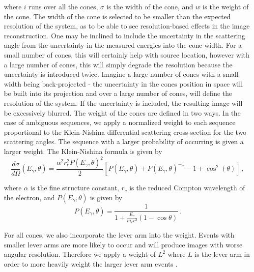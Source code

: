 \documentclass[10pt]{article}
\begin{document}
\noindent where $i$ runs over all the cones, $\sigma$ is the width of the cone, and $w$ is the weight of the cone. The width of the cone is selected to be smaller than the expected resolution of the system, as to be able to see resolution-based effects in the image reconstruction. One may be inclined to include the uncertainty in the scattering angle from the uncertainty in the measured energies into the cone width. For a small number of cones, this will certainly help with source location, however with a large number of cones, this will simply degrade the resolution because the uncertainty is introduced twice. Imagine a large number of cones with a small width being back-projected - the uncertainty in the cones position in space will be built into its projection and over a large number of cones, will define the resolution of the system. If the uncertainty is included, the resulting image will be excessively blurred. The weight of the cones are defined in two ways. In the case of ambiguous sequences, we apply a normalized weight to each sequence proportional to the Klein-Nishina differential scattering cross-section for the two scattering angles. The sequence with a larger probability of occurring is given a larger weight. The Klein-Nishina formula is given by 
%
\begin{equation}
\frac{d\sigma}{d\Omega}(E_\gamma, \theta) = \frac{\alpha^2 r_c^2 P(E_\gamma, \theta)^2}{2} \left[ P(E_\gamma, \theta) + P(E_\gamma, \theta)^{-1} - 1 + \cos^2(\theta) \right]\,,
\end{equation}

\noindent where $\alpha$ is the fine structure constant, $r_c$ is the reduced Compton wavelength of the electron, and $P(E_\gamma, \theta)$ is given by
\begin{equation}
P(E_\gamma, \theta) = \frac{1}{1+\frac{E_\gamma}{m_e c^2}(1-\cos\theta)}\,.
\end{equation}

For all cones, we also incorporate the lever arm into the weight. Events with smaller lever arms are more likely to occur and will produce images with worse angular resolution. Therefore we apply a weight of $L^2$ where $L$ is the lever arm in order to more heavily weight the larger lever arm events \cite{Haefner2015}.
\end{document}
